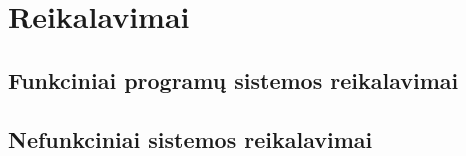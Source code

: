 ﻿\section{Reikalavimai}

\subsection{Funkciniai programų sistemos reikalavimai}
	
\subsection{Nefunkciniai sistemos reikalavimai}
